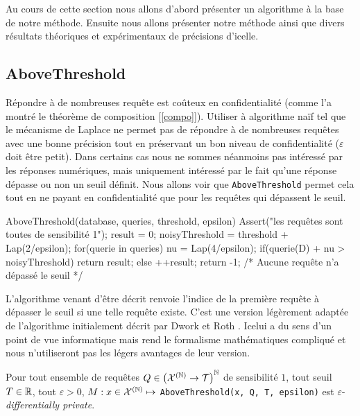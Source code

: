 Au cours de cette section nous allons d'abord présenter un algorithme à la base de notre méthode. Ensuite nous allons présenter notre méthode ainsi que divers résultats théoriques et expérimentaux de précisions d'icelle.

\subsection{AboveThreshold}

Répondre à de nombreuses requête est coûteux en confidentialité (comme l'a montré le théorème de composition [\ref{compo}]). Utiliser à algorithme naïf tel que le mécanisme de {\sc Laplace} \cite{10.1007/11681878_14} ne permet pas de répondre à de nombreuses requêtes avec une bonne précision tout en préservant un bon niveau de confidentialité (\(\varepsilon\) doit être petit). Dans certains cas nous ne sommes néanmoins pas intéressé par les réponses numériques, mais uniquement intéressé par le fait qu'une réponse dépasse ou non un seuil définit. Nous allons voir que \texttt{AboveThreshold} \cite{dwork2014the} permet cela tout en ne payant en confidentialité que pour les requêtes qui dépassent le seuil.

\label{AboveThreshold}
\begin{code}
    AboveThreshold(database, queries, threshold, epsilon){
        Assert("les requêtes sont toutes de sensibilité 1");
        result = 0;
        noisyThreshold = threshold + Lap(2/epsilon);
        for(querie in queries){
            nu = Lap(4/epsilon);
            if(querie(D) + nu > noisyThreshold)
                return result;
            else
                ++result; 
        }
        return -1; /* Aucune requête n'a dépassé le seuil */
    }
\end{code}

L'algorithme venant d'être décrit renvoie l'indice de la première requête à dépasser le seuil si une telle requête existe. C'est une version légèrement adaptée de l'algorithme initialement décrit par {\sc Dwork} et {\sc Roth} \cite[page 57]{dwork2014the}. Icelui a du sens d'un point de vue informatique mais rend le formalisme mathématiques compliqué et nous n'utiliseront pas les légers avantages de leur version.
 
\begin{theorem}
    Pour tout ensemble de requêtes \(Q \in \left( \mathcal X^{(\mathbb{N})} \to  \mathcal T \right)^{\mathbb{N}}\) de sensibilité \(1\), tout seuil \(T \in \mathbb{R}\), tout \(\varepsilon > 0\), \(M : x \in \mathcal X^{(\mathbb{N})} \mapsto \) \texttt{AboveThreshold(x, Q, T, epsilon)} est \(\varepsilon\)-\textit{differentially private}.
\end{theorem}

